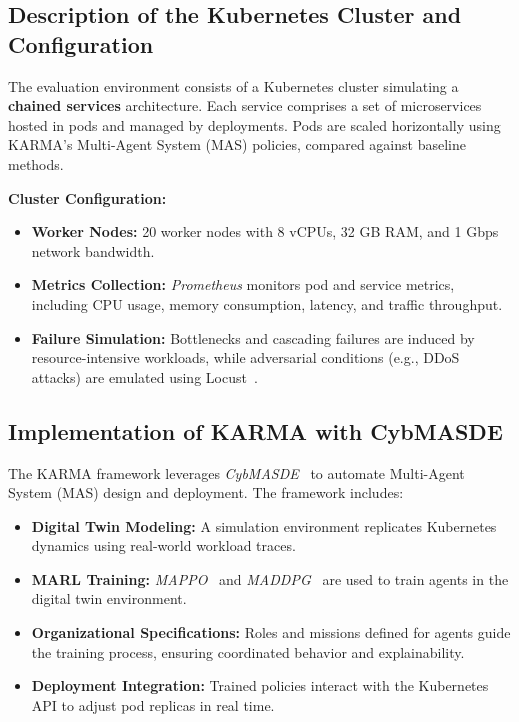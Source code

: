 \documentclass[conference]{IEEEtran}
\begin{document}
\subsection{Description of the Kubernetes Cluster and Configuration}

The evaluation environment consists of a Kubernetes cluster simulating a \textbf{chained services} architecture. Each service comprises a set of microservices hosted in pods and managed by deployments. Pods are scaled horizontally using KARMA's Multi-Agent System (MAS) policies, compared against baseline methods.

\textbf{Cluster Configuration:}
\begin{itemize}
    \item \textbf{Worker Nodes:} 20 worker nodes with 8 vCPUs, 32 GB RAM, and 1 Gbps network bandwidth.
    \item \textbf{Metrics Collection:} \textit{Prometheus} monitors pod and service metrics, including CPU usage, memory consumption, latency, and traffic throughput.
    \item \textbf{Failure Simulation:} Bottlenecks and cascading failures are induced by resource-intensive workloads, while adversarial conditions (e.g., DDoS attacks) are emulated using Locust~\cite{locust2021}.
\end{itemize}

\subsection{Implementation of KARMA with CybMASDE}

The KARMA framework leverages \textit{CybMASDE}~\cite{soule2024aomea} to automate Multi-Agent System (MAS) design and deployment. The framework includes:
\begin{itemize}
    \item \textbf{Digital Twin Modeling:} A simulation environment replicates Kubernetes dynamics using real-world workload traces.
    \item \textbf{MARL Training:} \textit{MAPPO}~\cite{yu2021mappo} and \textit{MADDPG}~\cite{lowe2017multi} are used to train agents in the digital twin environment.
    \item \textbf{Organizational Specifications:} Roles and missions defined for agents guide the training process, ensuring coordinated behavior and explainability.
    \item \textbf{Deployment Integration:} Trained policies interact with the Kubernetes API to adjust pod replicas in real time.
\end{itemize}
\end{document}
